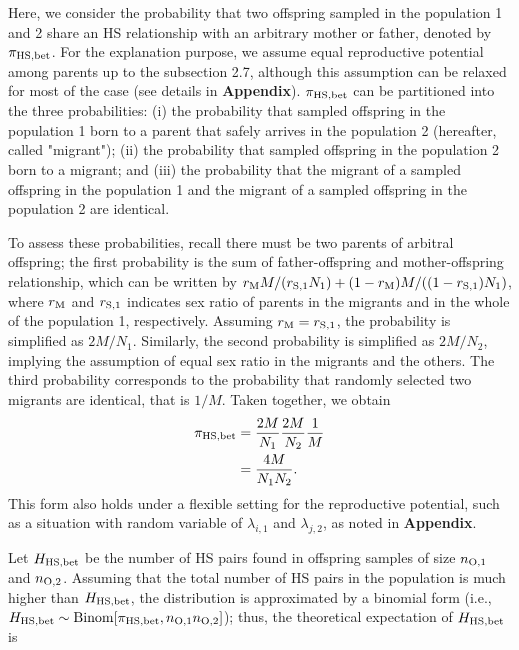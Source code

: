 \documentclass[12pt, English]{article}
\begin{document}
\begin{spacing}{1.9}
Here, we consider the probability that two offspring sampled in the population 1 and 2 share an HS relationship with an arbitrary mother or father, denoted by $\pi_{\rm HS, bet}$. For the explanation purpose, we assume equal reproductive potential among parents up to the subsection 2.7, although this assumption can be relaxed for most of the case (see details in {\bf Appendix}). $\pi_{\rm HS, bet}$ can be partitioned into the three probabilities: (i) the probability that sampled offspring in the population 1 born to a parent that safely arrives in the population 2 (hereafter, called "migrant"); (ii) the probability that sampled offspring in the population 2 born to a migrant; and (iii) the probability that the migrant of a sampled offspring in the population 1 and the migrant of a sampled offspring in the population 2 are identical. 

To assess these probabilities, recall there must be two parents of arbitral offspring; the first probability is the sum of father-offspring and mother-offspring relationship, which can be written by $r_{\rm M}M/(r_{\rm S,1}N_{1}) + (1 - r_{\rm M})M/((1-r_{\rm S,1})N_{1})$, where $r_{\rm M}$ and $r_{\rm S,1}$ indicates sex ratio of parents in the migrants and in the whole of the population 1, respectively. Assuming $r_{\rm M} = r_{\rm S,1}$, the probability is simplified as $2M/N_{1}$. Similarly, the second probability is simplified as $2M/N_{2}$, implying the assumption of equal sex ratio in the migrants and the others. The third probability corresponds to the probability that randomly selected two migrants are identical, that is $1/M$. Taken together, we obtain
\begin{align}
\pi_{\rm HS,bet} &= \frac{2M}{N_{1}} \frac{2M}{N_{2}} \frac{1}{M} \nonumber\\
&= \frac{4M}{N_{1}N_{2}}.
\label{HS-1}
\end{align}
This form also holds under a flexible setting for the reproductive potential, such as a situation with random variable of $\lambda_{i,1}$ and $\lambda_{j,2}$, as noted in {\bf Appendix}. 

Let $H_{\rm HS,bet}$ be the number of HS pairs found in offspring samples of size $n_{\rm O, 1}$ and $n_{\rm O, 2}$. Assuming that the total number of HS pairs in the population is much higher than $H_{\rm HS,bet}$, the distribution is approximated by a binomial form (i.e., $H_{\rm HS,bet} \sim {\rm Binom}[\pi_{\rm HS,bet}, n_{\rm O, 1} n_{\rm O, 2}]$); thus, the theoretical expectation of $H_{\rm HS,bet}$ is


\end{spacing}
\end{document}
